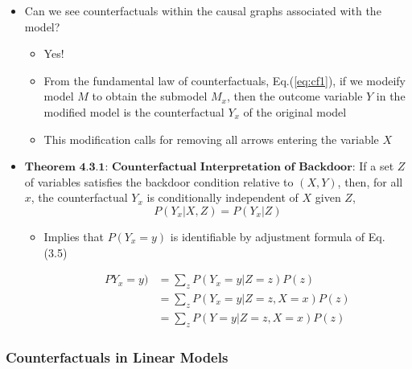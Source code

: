 \documentclass[]{article}
\providecommand{\tightlist}{%
  \setlength{\itemsep}{0pt}\setlength{\parskip}{0pt}}
\begin{document}
\begin{itemize}
\item
  Can we see counterfactuals within the causal graphs associated with
  the model?

  \begin{itemize}
  \tightlist
  \item
    Yes!
  \item
    From the fundamental law of counterfactuals, Eq.(\ref{eq:cf1}), if
    we modeify model \(M\) to obtain the submodel \(M_x\), then the
    outcome variable \(Y\) in the modified model is the counterfactual
    \(Y_x\) of the original model
  \item
    This modification calls for removing all arrows entering the
    variable \(X\)
  \end{itemize}
\item
  \(\textbf{Theorem 4.3.1: Counterfactual Interpretation of Backdoor}\):
  If a set \(Z\) of variables satisfies the backdoor condition relative
  to \((X,Y)\), then, for all \(x\), the counterfactual \(Y_x\) is
  conditionally independent of \(X\) given \(Z\),
  \[P(Y_x|X,Z) = P(Y_x|Z)\]

  \begin{itemize}
  \tightlist
  \item
    Implies that \(P(Y_x = y)\) is identifiable by adjustment formula of
    Eq. (3.5)

    \begin{equation*}
      \begin{split}
    PY_x = y) &= \sum\limits_z P(Y_x = y|Z = z)P(z) \\
              &=  \sum\limits_z P(Y_x = y|Z = z, X = x) P(z) \\
              &= \sum\limits_z P(Y = y|Z = z, X = x)P(z)
      \end{split}
    \end{equation*}
  \end{itemize}
\end{itemize}

\subsubsection{Counterfactuals in Linear
Models}\label{counterfactuals-in-linear-models}
\end{document}
